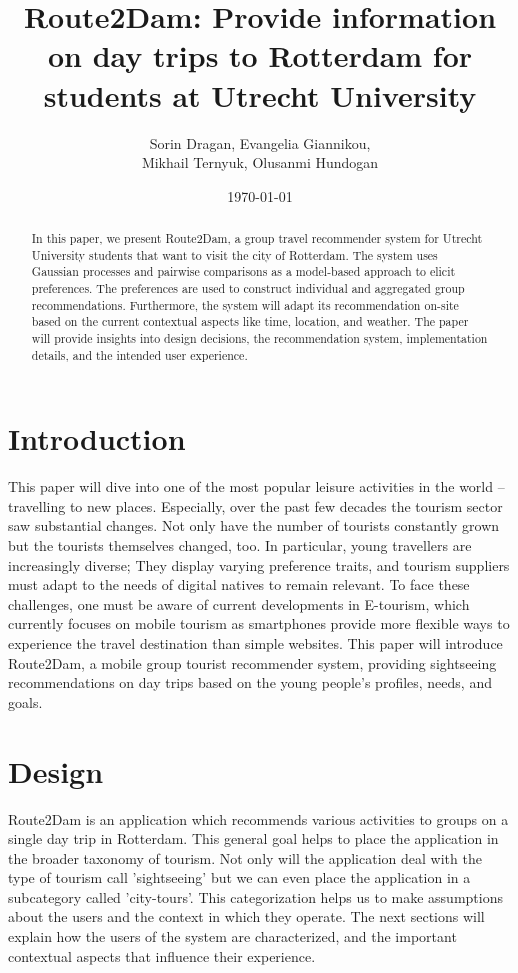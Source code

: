 \documentclass[11pt,a4paper,oneside]{article}
\title{\textbf{Route2Dam: Provide information on day trips to Rotterdam for students at Utrecht University}\newline \newline \newline}
\date{\today}
\author{Sorin Dragan, Evangelia Giannikou, \\Mikhail Ternyuk, Olusanmi Hundogan}
\begin{document}
\maketitle

\begin{abstract}
    In this paper, we present Route2Dam, a group travel recommender system for Utrecht University students that want to visit the city of Rotterdam. The system uses Gaussian processes and pairwise comparisons as a model-based approach to elicit preferences. 
    The preferences are used to construct individual and aggregated group recommendations. Furthermore, the system will adapt its recommendation on-site based on the current contextual aspects like time, location, and weather. The paper will provide insights into design decisions, the recommendation system, implementation details, and the intended user experience. 
\end{abstract}

\section{Introduction}
This paper will dive into one of the most popular leisure activities in the world -- travelling to new places.
Especially, over the past few decades the tourism sector saw substantial changes.\cite{smeral_StructuralViewTourism_2003}\cite{doi:10.18111/wtobarometereng.2020.18.1.1} Not only have the number of tourists constantly grown but the tourists themselves changed, too.\cite{OECD2020}
In particular, young travellers are increasingly diverse; They display varying preference traits, and tourism suppliers must adapt to the needs of digital natives to remain relevant.\cite{europeantravelcommission_StudyGenerationTravellers_2020}  To face these challenges, one must be aware of current developments in E-tourism, which currently focuses on mobile tourism as smartphones provide more flexible ways to experience the travel destination than simple websites.\cite{mobile_recommendation_systems} This paper will introduce Route2Dam, a mobile group tourist recommender system, providing sightseeing recommendations on day trips based on the young people's profiles, needs, and goals. 

\section{Design}
\label{sec:design}
Route2Dam is an application which recommends various activities to groups on a single day trip in Rotterdam. This general goal helps to place the application in the broader taxonomy of tourism. Not only will the application deal with the type of tourism \citeauthor{dunnross_SightseeingTouristsMotivation_1991} call 'sightseeing' but we can even place the application in a subcategory called 'city-tours'. This categorization helps us to make assumptions about the users and the context in which they operate. The next sections will explain how the users of the system are characterized, and the important contextual aspects that influence their experience. 
\end{document}
